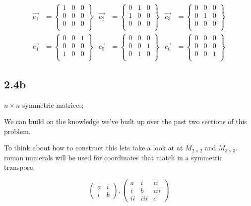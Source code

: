 \[
	\begin{aligned}
	\vec{e_{1}} &= \begin{Bmatrix}
		1 & 0 & 0 \\
		0 & 0 & 0 \\
		0 & 0 & 0 \\
	\end{Bmatrix} &
	\vec{e_{2}} &= \begin{Bmatrix}
		0 & 1 & 0 \\
		1 & 0 & 0 \\
		0 & 0 & 0 \\
	\end{Bmatrix} &
	\vec{e_{3}} &= \begin{Bmatrix}
		0 & 0 & 0 \\
		0 & 1 & 0 \\
		0 & 0 & 0 \\
	\end{Bmatrix} \\
	\vec{e_{4}} &= \begin{Bmatrix}
		0 & 0 & 1 \\
		0 & 0 & 0 \\
		1 & 0 & 0 \\
	\end{Bmatrix} &
	\vec{e_{5}} &= \begin{Bmatrix}
		0 & 0 & 0 \\
		0 & 0 & 1 \\
		0 & 1 & 0 \\
	\end{Bmatrix} &
	\vec{e_{6}} &= \begin{Bmatrix}
		0 & 0 & 0 \\
		0 & 0 & 0 \\
		0 & 0 & 1 \\
	\end{Bmatrix}
	\end{aligned}
\]

\subsection*{2.4b} $n \times n$ symmetric matrices;

We can build on the knowledge we've built up over the past two sections of this problem. 

To think about how to construct this lets take a look at at $M_{2 \times 2}$ and $M_{3 \times 3}$. roman numerals will be used for coordinates that match in a symmetric transpose.  

\[
	\begin{pmatrix}
		a & i \\
		i & b
	\end{pmatrix},
	\begin{pmatrix}
		a & i & ii \\
		i & b & iii \\
		ii & iii & c
	\end{pmatrix}
\]

